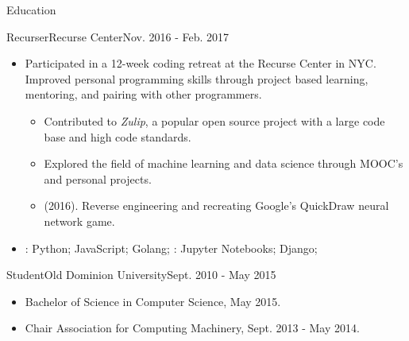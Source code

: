 \documentclass[]{mcdowellcv}
\begin{document}
    \begin{cvsection}{Education}
        \begin{cvsubsection}{Recurser}{Recurse Center}{Nov. 2016 - Feb. 2017}
            \begin{itemize}
                \item Participated in a 12-week coding retreat at the Recurse Center in NYC. Improved personal programming skills through project based learning, mentoring, and pairing with other programmers.
                \begin{itemize}
                    \item Contributed to \textit{Zulip}, a popular open source project with a large code base and high code standards.
                    \item Explored the field of machine learning and data science through MOOC's and personal projects.
                    \item {} (2016). Reverse engineering and recreating Google's QuickDraw neural network game.
                \end{itemize}
            \end{itemize}
            \begin{itemize}
                 \item {}: Python; JavaScript; Golang; : Jupyter Notebooks; Django;
            \end{itemize}
        \end{cvsubsection}
        \begin{cvsubsection}{Student}{Old Dominion University}{Sept. 2010 - May 2015}
            \begin{itemize}
                \item Bachelor of Science in Computer Science, May 2015.
                \item Chair Association for Computing Machinery, Sept. 2013 - May 2014.
            \end{itemize}
        \end{cvsubsection}
    \end{cvsection}
\end{document}
